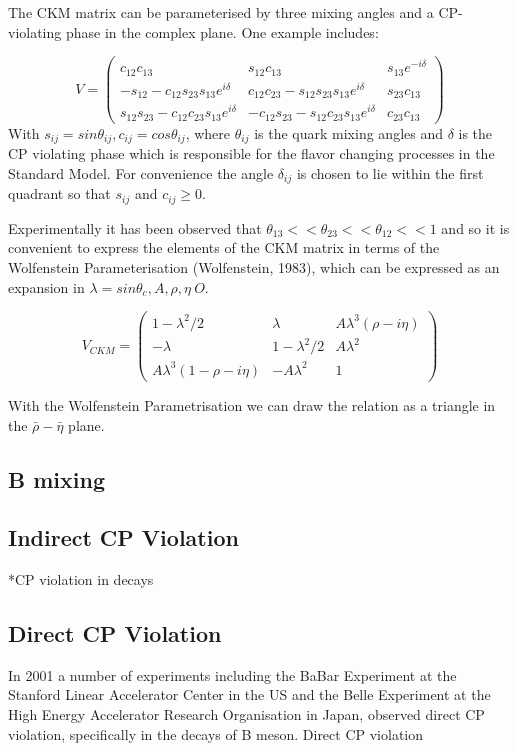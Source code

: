 \documentclass[12pt,a4paper]{article}
\begin{document}
The CKM matrix can be parameterised by three mixing angles and a CP-violating phase in the complex plane. One example includes:


\[ V=
\left(
 \begin{array}{ccc}
  c_{12}c_{13} & s_{12}c_{13} & s_{13}e^{-i\delta} \\
  -s_{12}-c_{12}s_{23}s_{13}e^{i\delta} & c_{12}c_{23}-s_{12}s_{23}s_{13}e^{i\delta} & s_{23}c_{13} \\
  s_{12}s_{23}-c_{12}c_{23}s_{13}e^{i\delta} & -c_{12}s_{23}-s_{12}c_{23}s_{13}e^{i\delta} & c_{23}c_{13}
 \end{array}
 \right)
\]
With $s_{ij} = sin\theta_{ij}, c_{ij} = cos\theta_{ij}$, where $\theta_{ij}$ is the quark mixing angles and $\delta$ is the CP violating phase which is responsible for the flavor changing processes in the Standard Model. For convenience the angle $\delta_{ij}$ is chosen to lie within the first quadrant so that $s_{ij}$ and $c_{ij} \geq 0$. 

Experimentally it has been observed that $\theta_{13} << \theta_{23} << \theta_{12} << 1 $ and so it is convenient to express the elements of the CKM matrix in terms of the Wolfenstein Parameterisation (Wolfenstein, 1983), which can be expressed as an expansion in $\lambda = sin\theta_c, A, \rho, \eta ~ O$.

\[V_{CKM}=
\left(
 \begin{array}{ccc}
  1-\lambda^2/2 & \lambda & A\lambda^3(\rho-i\eta) \\
  -\lambda & 1-\lambda^2/2 & A\lambda^2 \\
  A\lambda^3(1-\rho-i\eta) & -A\lambda^2 & 1
 \end{array}
 \right)
\]

With the Wolfenstein Parametrisation we can draw the relation as a triangle in the $\bar{\rho} - \bar{\eta}$ plane.



\subsection{B mixing}

\subsection{Indirect CP Violation}
 
 
*CP violation in decays
 
\subsection{Direct CP Violation}
In 2001 a number of experiments including the BaBar Experiment at the Stanford Linear Accelerator Center in the US and the Belle Experiment at the High Energy Accelerator Research Organisation in Japan, observed direct CP violation, specifically in the decays of B meson. Direct CP violation 
\end{document}
